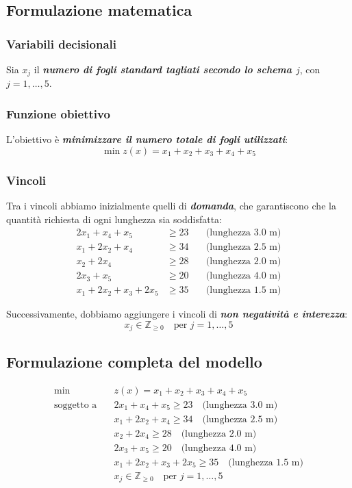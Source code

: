 \subsection{Formulazione matematica}
\subsubsection{Variabili decisionali}
Sia $x_j$ il \textbf{\textit{numero di fogli standard tagliati secondo lo schema $j$}}, con $j = 1, \ldots, 5$.


\subsubsection{Funzione obiettivo}
L'obiettivo è \textbf{\textit{minimizzare il numero totale di fogli utilizzati}}:
\[
\min z(x) = x_1 + x_2 + x_3 + x_4 + x_5
\]


\subsubsection{Vincoli}
Tra i vincoli abbiamo inizialmente quelli di \textbf{\textit{domanda}}, che garantiscono che la quantità richiesta di ogni lunghezza sia soddisfatta:
\[
\begin{aligned}
2x_1 + x_4 + x_5 &\geq 23 \quad &\text{(lunghezza 3.0 m)} \\
x_1 + 2x_2 + x_4 &\geq 34 \quad &\text{(lunghezza 2.5 m)} \\
x_2 + 2x_4 &\geq 28 \quad &\text{(lunghezza 2.0 m)} \\
2x_3 + x_5 &\geq 20 \quad &\text{(lunghezza 4.0 m)} \\
x_1 + 2x_2 + x_3 + 2x_5 &\geq 35 \quad &\text{(lunghezza 1.5 m)}
\end{aligned}
\]

Successivamente, dobbiamo aggiungere i vincoli di \textbf{\textit{non negatività e interezza}}:
\[
x_j \in \mathbb{Z}_{\geq 0} \quad \text{per } j = 1, \dots, 5
\]

\subsection{Formulazione completa del modello}
\[
\begin{aligned}
\min \quad & z(x) = x_1 + x_2 + x_3 + x_4 + x_5 \\
\text{soggetto a} \quad & 2x_1 + x_4 + x_5 \geq 23 \quad \text{(lunghezza 3.0 m)} \\
& x_1 + 2x_2 + x_4 \geq 34 \quad \text{(lunghezza 2.5 m)} \\
& x_2 + 2x_4 \geq 28 \quad \text{(lunghezza 2.0 m)} \\
& 2x_3 + x_5 \geq 20 \quad \text{(lunghezza 4.0 m)} \\
& x_1 + 2x_2 + x_3 + 2x_5 \geq 35 \quad \text{(lunghezza 1.5 m)} \\
& x_j \in \mathbb{Z}_{\geq 0} \quad \text{per } j = 1, \dots, 5
\end{aligned}
\]

